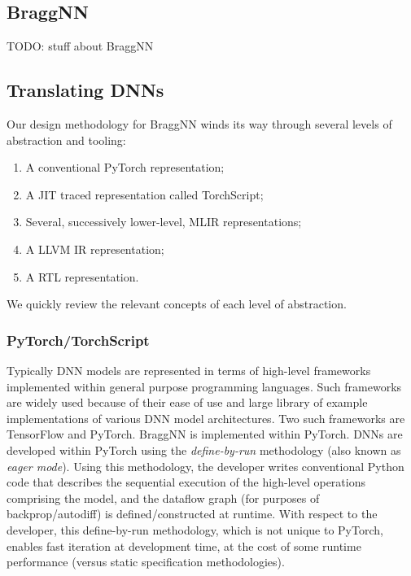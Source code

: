 \subsection{BraggNN}\label{subsec:braggnn}

TODO: stuff about BraggNN

\subsection{Translating DNNs}\label{subsec:translatingdnns}
Our design methodology for BraggNN winds its way through several levels of abstraction and tooling:

\begin{enumerate}
	\item A conventional PyTorch representation;
	\item A JIT traced representation called TorchScript;
	\item Several, successively lower-level, MLIR representations;
	\item A LLVM IR representation;
	\item A RTL representation.
\end{enumerate}

We quickly review the relevant concepts of each level of abstraction.

\subsubsection{PyTorch/TorchScript}\label{subsec:pytorch}

Typically DNN models are represented in terms of high-level frameworks implemented within general purpose programming languages.
Such frameworks are widely used because of their ease of use and large library of example implementations of various DNN model architectures.
Two such frameworks are TensorFlow and PyTorch.
BraggNN is implemented within PyTorch.
DNNs are developed within PyTorch using the \emph{define-by-run} methodology (also known as \emph{eager mode}).
Using this methodology, the developer writes conventional Python code that describes the sequential execution of the high-level operations comprising the model, and the dataflow graph (for purposes of backprop/autodiff) is defined/constructed at runtime.
With respect to the developer, this define-by-run methodology, which is not unique to PyTorch, enables fast iteration at development time, at the cost of some runtime performance (versus static specification methodologies).

